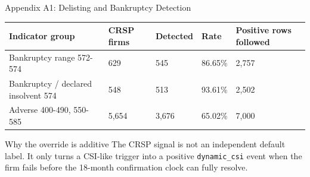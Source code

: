 \documentclass[10pt]{beamer}\usepackage[]{graphicx}\usepackage[table]{xcolor}
\newcommand{\dyn}{\texttt{dynamic\_csi}}
\begin{document}
\begin{frame}{Appendix A1: Delisting and Bankruptcy Detection}
\scriptsize
\begin{table}[ht]
\centering
\begin{tabular}{L{4.0cm}R{1.2cm}R{1.2cm}R{1.2cm}R{1.35cm}}
\toprule
Indicator group & CRSP firms & Detected & Rate & Positive rows followed \\
\midrule
Bankruptcy range 572-574 & 629 & 545 & 86.65\% & 2,757 \\
Bankruptcy / declared insolvent 574 & 548 & 513 & 93.61\% & 2,502 \\
Adverse 400-490, 550-585 & 5,654 & 3,676 & 65.02\% & 7,000 \\
\bottomrule
\end{tabular}
\end{table}

\vspace{0.3em}
\begin{block}{Why the override is additive}
\scriptsize
The CRSP signal is not an independent default label. It only turns a CSI-like trigger into a positive \dyn{} event when the firm fails before the 18-month confirmation clock can fully resolve.
\end{block}
\end{frame}
\end{document}
